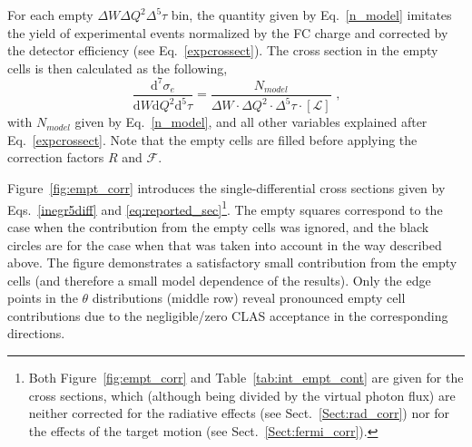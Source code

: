 For each empty $\Delta W\Delta Q^2\Delta^{5}\tau$ bin, the quantity given by Eq.~\eqref{n_model} imitates the yield of experimental events normalized by the FC charge and corrected by the detector efficiency (see Eq.~\eqref{expcrossect}). The cross section in the empty cells is then calculated as the following,
\begin{equation}
\frac{\textrm{d}^{7}\sigma_{e}}{\textrm{d}W\textrm{d}Q^{2}\textrm{d}^{5}\tau} = \frac{N_{model}}{
\Delta W \! \cdot \! \Delta Q^{2} \! \cdot \! \Delta^{5} \tau \! \cdot \! \left [ \mathcal{L} \right ] }\textrm{ ,}
\label{cr_sect_empt}
\end{equation}
with $N_{model}$ given by Eq.~\eqref{n_model}, and all other variables explained after Eq.~\eqref{expcrossect}. Note that the empty cells are filled before applying the correction factors $R$ and $\mathcal{F}$.


Figure~\ref{fig:empt_corr} introduces the single-differential cross sections given by Eqs.~\eqref{inegr5diff} and \eqref{eq:reported_sec}\footnote[1]{Both Figure~\ref{fig:empt_corr} and Table~\ref{tab:int_empt_cont} are given for the cross sections, which (although being divided by the virtual photon flux) are neither corrected for the radiative effects (see Sect.~\ref{Sect:rad_corr}) nor for the effects of the target motion (see Sect.~\ref{Sect:fermi_corr}). }. The empty squares correspond to the case when the contribution from the empty cells was ignored, and the black circles are for the case when that was taken into account in the way described above. The figure demonstrates a satisfactory small contribution from the empty cells (and therefore a small model dependence of the results). Only the edge points in the $\theta$ distributions (middle row) reveal pronounced empty cell contributions due to the negligible/zero CLAS acceptance in the corresponding directions.


